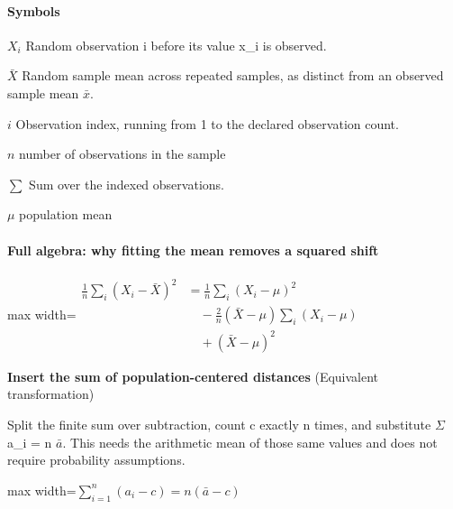 \documentclass[11pt,a4paper]{article}
\begin{document}
\paragraph{Symbols}
\par\noindent\textbf{\(X_i\)} Random observation i before its value x\_i is observed.
\par\noindent\textbf{\(\bar X\)} Random sample mean across repeated samples, as distinct from an observed sample mean \ensuremath{\bar{x}}.
\par\noindent\textbf{\(i\)} Observation index, running from 1 to the declared observation count.
\par\noindent\textbf{\(n\)} number of observations in the sample
\par\noindent\textbf{\(\sum\)} Sum over the indexed observations.
\par\noindent\textbf{\(\mu\)} population mean
\paragraph{Full algebra: why fitting the mean removes a squared shift}
\begin{center}\begin{adjustbox}{max width=\linewidth}$\displaystyle \begin{aligned}\frac1n\sum_i(X_i-\bar X)^2&=\frac1n\sum_i(X_i-\mu)^2\\&\quad-\frac2n(\bar X-\mu)\sum_i(X_i-\mu)\\&\quad+(\bar X-\mu)^2\end{aligned}$\end{adjustbox}\end{center}
\noindent\textbf{Insert the sum of population-centered distances} (Equivalent transformation)\par
Split the finite sum over subtraction, count c exactly n times, and substitute \ensuremath{\Sigma}a\_i = n \ensuremath{\bar{a}}. This needs the arithmetic mean of those same values and does not require probability assumptions.
\begin{center}\begin{adjustbox}{max width=\linewidth}$\displaystyle \sum_{i=1}^n(a_i-c)=n(\bar a-c)$\end{adjustbox}\end{center}
\end{document}
